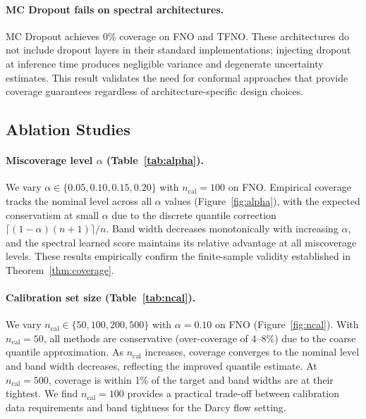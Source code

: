 \paragraph{MC Dropout fails on spectral architectures.}
MC Dropout achieves 0\% coverage on FNO and TFNO. These architectures do not include dropout layers in their standard implementations; injecting dropout at inference time produces negligible variance and degenerate uncertainty estimates. This result validates the need for conformal approaches that provide coverage guarantees regardless of architecture-specific design choices.

\subsection{Ablation Studies}
\label{subsec:ablation}

\paragraph{Miscoverage level $\alpha$ (Table~\ref{tab:alpha}).}
We vary $\alpha \in \{0.05, 0.10, 0.15, 0.20\}$ with $n_{\mathrm{cal}} = 100$ on FNO. Empirical coverage tracks the nominal level across all $\alpha$ values (Figure~\ref{fig:alpha}), with the expected conservatism at small $\alpha$ due to the discrete quantile correction $\lceil (1-\alpha)(n+1) \rceil / n$. Band width decreases monotonically with increasing $\alpha$, and the spectral learned score maintains its relative advantage at all miscoverage levels. These results empirically confirm the finite-sample validity established in Theorem~\ref{thm:coverage}.

\paragraph{Calibration set size (Table~\ref{tab:ncal}).}
We vary $n_{\mathrm{cal}} \in \{50, 100, 200, 500\}$ with $\alpha = 0.10$ on FNO (Figure~\ref{fig:ncal}). With $n_{\mathrm{cal}} = 50$, all methods are conservative (over-coverage of 4--8\%) due to the coarse quantile approximation. As $n_{\mathrm{cal}}$ increases, coverage converges to the nominal level and band width decreases, reflecting the improved quantile estimate. At $n_{\mathrm{cal}} = 500$, coverage is within 1\% of the target and band widths are at their tightest. We find $n_{\mathrm{cal}} = 100$ provides a practical trade-off between calibration data requirements and band tightness for the Darcy flow setting.

